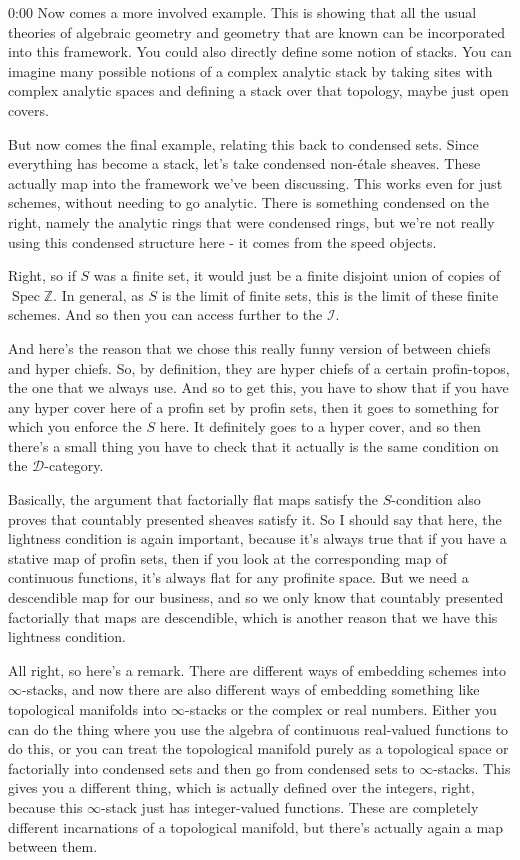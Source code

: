 \begin{unfinished}{0:00}
Now comes a more involved example. This is showing that all the usual theories of algebraic geometry and geometry that are known can be incorporated into this framework. You could also directly define some notion of stacks. You can imagine many possible notions of a complex analytic stack by taking sites with complex analytic spaces and defining a stack over that topology, maybe just open covers.

But now comes the final example, relating this back to condensed sets. Since everything has become a stack, let's take condensed non-étale sheaves. These actually map into the framework we've been discussing. This works even for just schemes, without needing to go analytic. There is something condensed on the right, namely the analytic rings that were condensed rings, but we're not really using this condensed structure here - it comes from the speed objects.

Right, so if $S$ was a finite set, it would just be a finite disjoint union of copies of $\operatorname{Spec} \mathbb{Z}$. In general, as $S$ is the limit of finite sets, this is the limit of these finite schemes. And so then you can access further to the $\mathcal{I}$. 

And here's the reason that we chose this really funny version of between chiefs and hyper chiefs. So, by definition, they are hyper chiefs of a certain profin-topos, the one that we always use. And so to get this, you have to show that if you have any hyper cover here of a profin set by profin sets, then it goes to something for which you enforce the $S$ here. It definitely goes to a hyper cover, and so then there's a small thing you have to check that it actually is the same condition on the $\mathcal{D}$-category.

Basically, the argument that factorially flat maps satisfy the $S$-condition also proves that countably presented sheaves satisfy it. So I should say that here, the lightness condition is again important, because it's always true that if you have a stative map of profin sets, then if you look at the corresponding map of continuous functions, it's always flat for any profinite space. But we need a descendible map for our business, and so we only know that countably presented factorially that maps are descendible, which is another reason that we have this lightness condition.

All right, so here's a remark. There are different ways of embedding schemes into $\infty$-stacks, and now there are also different ways of embedding something like topological manifolds into $\infty$-stacks or the complex or real numbers. Either you can do the thing where you use the algebra of continuous real-valued functions to do this, or you can treat the topological manifold purely as a topological space or factorially into condensed sets and then go from condensed sets to $\infty$-stacks. This gives you a different thing, which is actually defined over the integers, right, because this $\infty$-stack just has integer-valued functions. These are completely different incarnations of a topological manifold, but there's actually again a map between them.


\end{unfinished}

